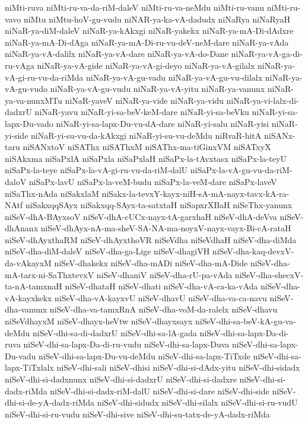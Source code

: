 {niMti-ruva
niMti-ru-va-da-riM-daleV
niMti-ru-va-neMdu
niMti-ru-vanu
niMti-ru-vavo
niMtu
niMtu-hoV-gu-vudu
niNAR-ya-ka-vA-dadudx
niNaRya
niNaRyaH
niNaR-ya-diM-daleV
niNaR-ya-kAkxgi
niNaR-yakekx
niNaR-ya-mA-Di-dAdxre
niNaR-ya-mA-Di-dAga
niNaR-ya-mA-Di-ru-vu-deV-neM-dare
niNaR-ya-vAda
niNaR-ya-vA-dalilx
niNaR-ya-vA-dare
niNaR-ya-vA-do-Dane
niNaR-ya-vA-ga-di-ru-vAga
niNaR-ya-vA-gide
niNaR-ya-vA-gi-deyo
niNaR-ya-vA-gilalx
niNaR-ya-vA-gi-ru-vu-da-riMda
niNaR-ya-vA-gu-vadu
niNaR-ya-vA-gu-vu-dilalx
niNaR-ya-vA-gu-vudo
niNaR-ya-vA-gu-vudu
niNaR-ya-vA-yitu
niNaR-ya-vanunx
niNaR-ya-va-nunxMTu
niNaR-yaveV
niNaR-ya-vide
niNaR-ya-vidu
niNaR-ya-vi-lalx-di-dadxrU
niNaR-yavu
niNaR-yi-sa-beV-keM-dare
niNaR-yi-sa-beVku
niNaR-yi-sa-lapx-Du-vado
niNaR-yi-sa-lapx-Du-vu-dA-dare
niNaR-yi-salu
niNaR-yisi
niNaR-yi-side
niNaR-yi-su-vu-da-kAkxgi
niNaR-yi-su-vu-deMdu
niRvaR-hitA
niSANx-taru
niSANxtoV
niSAThx
niSAThxM
niSAThx-ma-tiGinxVM
niSATxyX
niSAkxma
niSaPxlA
niSaPxla
niSaPxlaH
niSaPx-la-tAvxtasx
niSaPx-la-teyU
niSaPx-la-teye
niSaPx-la-vA-gi-ru-vu-da-riM-dalU
niSaPx-la-vA-gu-vu-da-riM-daloV
niSaPx-lavU
niSaPx-la-veM-budu
niSaPx-la-veM-dare
niSaPx-laveV
niSaThx-nAda
niSakxlaM
niSakx-la-tevxY-kayx-niH-sA-mA-nayx-tavx-kA-ra-NAtf
niSakxqqSAyx
niSakxqq-SAyx-ta-satxtaH
niSapxrXBaH
niSeThx-yanunx
niSeV-dhA-BAyxsoV
niSeV-dhA-cUCx-nayx-tA-garxhaH
niSeV-dhA-deVva
niSeV-dhAnanx
niSeV-dhAyx-nA-ma-sheV-SA-NA-ma-noyxV-nayx-vayx-Bi-cA-rataH
niSeV-dhAyxthaRM
niSeV-dhAyxthoVR
niSeVdha
niSeVdhaH
niSeV-dha-diMda
niSeV-dha-diM-daleV
niSeV-dha-ga-Lige
niSeV-dhagiVH
niSeV-dha-kaq-devxV-da-vAkayxM
niSeV-dhakekx
niSeV-dha-mADi
niSeV-dha-mA-Dide
niSeV-dha-mA-tarx-ni-SaThxtevxV
niSeV-dhaniV
niSeV-dha-rU-pa-vAda
niSeV-dha-shecxV-ta-nA-tamxnaH
niSeV-dhataH
niSeV-dhati
niSeV-dha-vA-ca-ka-vAda
niSeV-dha-vA-kayxkekx
niSeV-dha-vA-kayxvU
niSeV-dhavU
niSeV-dha-va-ca-navu
niSeV-dha-vanunx
niSeV-dha-va-tamxRnA
niSeV-dha-voM-da-ralelx
niSeV-dhavu
niSeVdhayxM
niSeV-dhayx-heVtw
niSeV-dhayxsayx
niSeV-dhi-sa-beV-kA-gu-va-deMdu
niSeV-dhi-sa-di-dadxrU
niSeV-dhi-sa-lA-gada
niSeV-dhi-sa-lapx-Da-di-ruva
niSeV-dhi-sa-lapx-Da-di-ru-vudu
niSeV-dhi-sa-lapx-Duva
niSeV-dhi-sa-lapx-Du-vadu
niSeV-dhi-sa-lapx-Du-vu-deMdu
niSeV-dhi-sa-lapx-TiTxde
niSeV-dhi-sa-lapx-TiTxlalx
niSeV-dhi-sali
niSeV-dhisi
niSeV-dhi-si-dAdx-yitu
niSeV-dhi-sidadx
niSeV-dhi-si-dadxnunx
niSeV-dhi-si-dadxrU
niSeV-dhi-si-dadxre
niSeV-dhi-si-dadx-riMda
niSeV-dhi-si-dadx-riM-dalU
niSeV-dhi-si-dare
niSeV-dhi-side
niSeV-dhi-si-de-yA-dadx-riMda
niSeV-dhi-sidudx
niSeV-dhi-silalx
niSeV-dhi-si-ru-vudU
niSeV-dhi-si-ru-vudu
niSeV-dhi-sive
niSeV-dhi-su-tatx-de-yA-dadx-riMda
}
